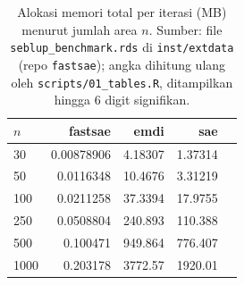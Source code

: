 \begin{table}[htbp]
\centering
\caption{Alokasi memori total per iterasi (MB) menurut jumlah area $n$. Sumber: file \texttt{seblup\_benchmark.rds} di \texttt{inst/extdata} (repo \texttt{fastsae}); angka dihitung ulang oleh \texttt{scripts/01\_tables.R}, ditampilkan hingga 6 digit signifikan.}
\label{tab:mem-sfh}
\small
\begin{tabular}{lrrrr}
\toprule
$n$ & fastsae & emdi & sae \\
\midrule
30 & 0.00878906 & 4.18307 & 1.37314 \\
50 & 0.0116348 & 10.4676 & 3.31219 \\
100 & 0.0211258 & 37.3394 & 17.9755 \\
250 & 0.0508804 & 240.893 & 110.388 \\
500 & 0.100471 & 949.864 & 776.407 \\
1000 & 0.203178 & 3772.57 & 1920.01 \\
\bottomrule
\end{tabular}
\end{table}

